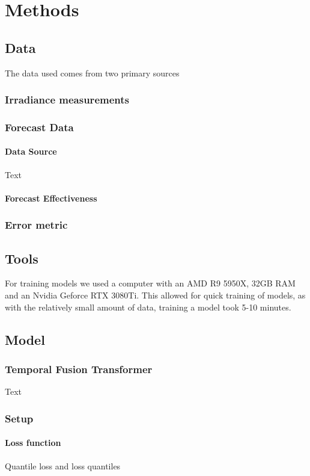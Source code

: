 \chapter{Methods}


\section{Data}
The data used comes from two primary sources
\subsection{Irradiance measurements}
\subsection{Forecast Data}
\subsubsection{Data Source}
Text\cite{gueymard_global_2008, rognvaldsson_numerical_2013, jimenez_wrf-solar_2016}
\subsubsection{Forecast Effectiveness}
\subsection{Error metric}


\section{Tools}

For training models we used a computer with an AMD R9 5950X, 32GB RAM and an Nvidia Geforce RTX 3080Ti. This allowed for quick training of models, as with the relatively small amount of data, training a model took 5-10 minutes.

\section{Model}
    \subsection{Temporal Fusion Transformer}
    Text \cite{lim_temporal_2020}
    \subsection{Setup}
    \subsubsection{Loss function}\label{cha:loss_function}
    Quantile loss and loss quantiles